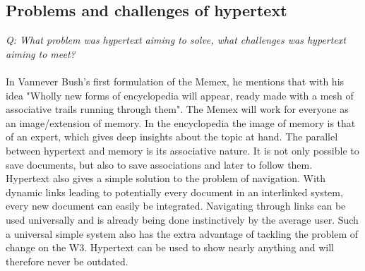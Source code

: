 \documentclass{sig-alternate-05-2015}
\begin{document}
\subsection{Problems and challenges of hypertext}
{\it Q: What problem was hypertext aiming to solve, what challenges was hypertext aiming to meet?}\\\\
In Vannever Bush's first formulation of the Memex, he mentions that with his idea "Wholly new forms
of encyclopedia will appear, ready made with a mesh of associative trails running through them"\cite{vBush}. The Memex will work for everyone as an image/extension of memory. In the encyclopedia the image of memory is that of an expert, which gives deep insights about the topic at hand. The parallel between hypertext and memory is its associative nature. It is not only possible to save documents, but also to save associations and later to follow them. \\
Hypertext also gives a simple solution to the problem of navigation. With dynamic links leading to potentially every document in an interlinked system, every new document can easily be integrated. Navigating through links can be used universally and is already being done instinctively by the average user. Such a universal simple system also has the extra advantage of tackling the problem of change on the W3. Hypertext can be used to show nearly anything and will therefore never be outdated.
\end{document}
